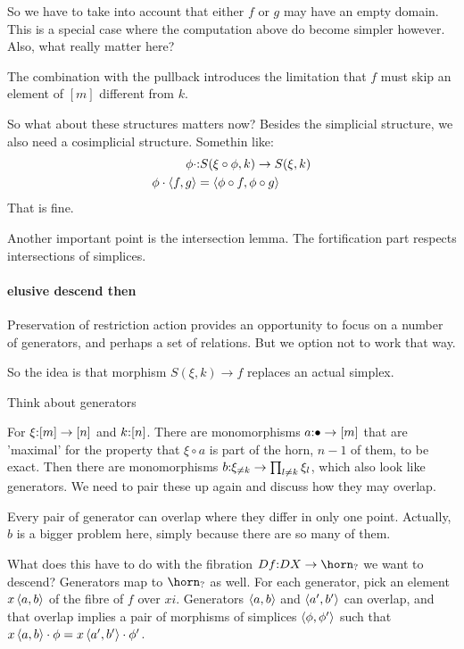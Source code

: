 \documentclass[csh.tex]{subfiles}
\begin{document}
So we have to take into account that either $f$ or $g$ may have an empty domain. This is a special case where the computation above do become simpler however. Also, what really matter here?

The combination with the pullback introduces the limitation that $f$ must skip an element of $[m]$ different from $k$.

So what about these structures matters now?
Besides the simplicial structure, we also need a cosimplicial structure. Somethin like:
\begin{align*}
\phi \cdot  &\mathord : S(\xi\circ \phi,k) \to S(\xi,k)\\
\phi \cdot\left\langle f,g \right\rangle &= \left\langle \phi\circ f,\phi\circ g \right\rangle
\end{align*} 
That is fine.

Another important point is the intersection lemma. The fortification part respects intersections of simplices.

\paragraph{elusive descend then}
Preservation of restriction action provides an opportunity to focus on a number of generators, and perhaps a set of relations. But we option not to work that way. 

So the idea is that morphism $S(\xi,k)\to f$ replaces an actual simplex.

Think about generators

For $\xi\mathord : [m]\to[n]$ and $k\mathord : [n]$. There are monomorphisms $a\mathord :\bullet \to [m]$ that are 'maximal' for the property that $\xi\circ a$ is part of the horn, $n - 1$ of them, to be exact. Then there are monomorphisms $b\mathord : \xi_{\neq k} \to \prod_{l\neq k} \xi_l$, which also look like generators. We need to pair these up again and discuss how they may overlap.

Every pair of generator can overlap where they differ in only one point. 
Actually, $b$ is a bigger problem here, simply because there are so many of them.

What does this have to do with the fibration $Df\of DX\to\horn_{?}$ we want to descend?
Generators map to $\horn_{?}$ as well. For each generator, pick an element $x\left\langle a,b \right\rangle$ of the fibre of $f$ over $xi$.
Generators $\left\langle a,b \right\rangle$ and $\left\langle a',b' \right\rangle$ can overlap, and that overlap implies a pair of morphisms of simplices $\left\langle \phi,\phi' \right\rangle$ such that $x\left\langle a,b \right\rangle\cdot \phi = x\left\langle a',b' \right\rangle\cdot \phi'$.
\end{document}
